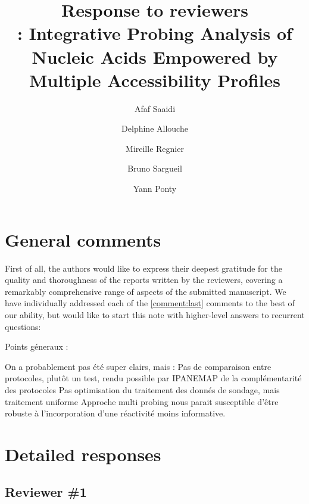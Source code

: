 \documentclass[9pt,hyperref]{article} %
\title{Response to reviewers\\[.3em]\OurTool{}:  Integrative Probing Analysis of Nucleic Acids Empowered by Multiple Accessibility Profiles}
\author{
Afaf Saaidi \and
Delphine Allouche \and
Mireille Regnier \and
Bruno Sargueil \and
Yann Ponty}
\date{} %
\begin{document}
\maketitle

\tableofcontents


\section{General comments}

	
First of all, the authors would like to express their deepest gratitude for the quality and thoroughness of the reports written by the reviewers, covering a remarkably comprehensive range of aspects of the submitted manuscript. We have individually addressed each of the \ref{comment:last} comments to the best of our ability, but would like to start this note with higher-level answers to recurrent questions:



Points géneraux :

On a probablement pas été super clairs, mais :
Pas de comparaison entre protocoles, plutôt un test, rendu possible par IPANEMAP de la complémentarité des protocoles
Pas optimisation du traitement des donnés de sondage, mais traitement uniforme
Approche multi probing nous parait susceptible d’être robuste à l’incorporation d’une réactivité moins informative.

\section{Detailed responses}

\subsection{Reviewer \#1}
\end{document}
